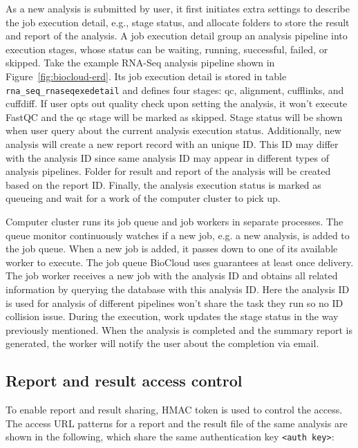 As a new analysis is submitted by user, it first initiates extra settings to
describe the job execution detail, e.g., stage status, and allocate folders to
store the result and report of the analysis. A job execution detail group an
analysis pipeline into execution stages, whose status can be waiting, running,
successful, failed, or skipped. Take the example RNA-Seq analysis pipeline
shown in Figure~\ref{fig:biocloud-erd}. Its job execution detail is stored in
table \texttt{rna\_seq\_rnaseqexedetail} and defines four stages: qc,
alignment, cufflinks, and cuffdiff. If user opts out quality
check upon setting the analysis, it won't execute FastQC and the qc stage will
be marked as skipped. Stage status will be shown when user query about the
current analysis execution status. Additionally, new analysis will create a new
report record with an unique ID. This ID may differ with the analysis ID since
same analysis ID may appear in different types of analysis pipelines. Folder
for result and report of the analysis will be created based on the report ID.
Finally, the analysis execution status is marked as queueing and wait for a
work of the computer cluster to pick up.


Computer cluster runs its job queue and job workers in separate processes. The
queue monitor continuously watches if a new job, e.g. a new analysis, is added
to the job queue. When a new job is added, it passes down to one of its
available worker to execute. The job queue BioCloud uses guarantees at least
once delivery. The job worker receives a new job with the analysis ID and
obtains all related information by querying the database with this analysis ID.
Here the analysis ID is used for analysis of different pipelines won't share
the task they run so no ID collision issue. During the execution, work updates
the stage status in the way previously mentioned. When the analysis is
completed and the summary report is generated, the worker will notify the user
about the completion via email.


\subsection{Report and result access control}

To enable report and result sharing, HMAC token is used to control the access.
The access URL patterns for a report and the result file of the same analysis
are shown in the following, which share the same authentication key
\texttt{<auth key>}:

